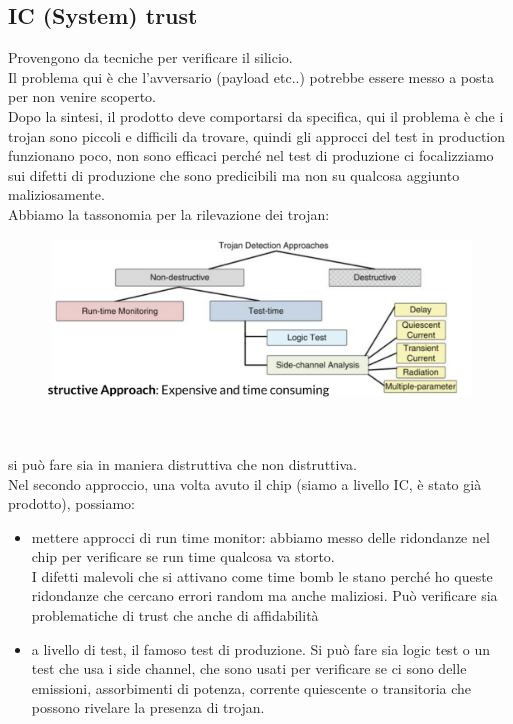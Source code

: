 \documentclass[oneside, 12pt]{extbook}
\begin{document}
\subsection{IC (System) trust}
Provengono da tecniche per verificare il silicio.
\\Il problema qui è che l'avversario (payload etc..) potrebbe essere messo a posta per non venire scoperto.
\\Dopo la sintesi, il prodotto deve comportarsi da specifica, qui il problema è che i trojan sono piccoli e difficili da trovare, quindi gli approcci del test in production funzionano poco, non sono efficaci perché nel test di produzione ci focalizziamo sui difetti di produzione che sono predicibili ma non su qualcosa aggiunto maliziosamente.
\\Abbiamo la tassonomia per la rilevazione dei trojan:\\
\begin{figure}[!h]
	\includegraphics[scale=0.4]{immagini/hardware/ic_troj.png}
\end{figure}
\\\\si può fare sia in maniera distruttiva che non distruttiva.\\
Nel secondo approccio, una volta avuto il chip (siamo a livello IC, è stato già prodotto), possiamo:
\begin{itemize}
	\item mettere approcci di run time monitor: abbiamo messo delle ridondanze nel chip per verificare se run time qualcosa va storto.
	\\I difetti malevoli che si attivano come time bomb le stano perché ho queste ridondanze che cercano errori random ma anche maliziosi. Può verificare sia problematiche di trust che anche di affidabilità
	\item a livello di test, il famoso test di produzione. Si può fare sia logic test o un test che usa i side channel, che sono usati per verificare se ci sono delle emissioni, assorbimenti di potenza, corrente quiescente o transitoria che possono rivelare la presenza di trojan.
\end{itemize}
\end{document}
